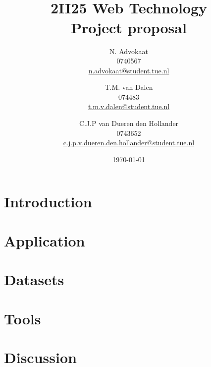 \documentclass[a4paper,11pt]{article}
\title{
	\HRule\\[0.6cm]
	{\Huge \bfseries 2II25 Web Technology}\\
	{\huge Project proposal}
	\HRule\\[0.4cm]
}
\author{
	N. Advokaat\\
	0740567\\
	\href{mailto:n.advokaat@student.tue.nl}{n.advokaat@student.tue.nl}
	\and
	T.M. van Dalen\\
	074483\\
	\href{mailto:t.m.v.dalen@student.tue.nl}{t.m.v.dalen@student.tue.nl}
	\and
	C.J.P van Dueren den Hollander\\
	0743652\\
	\href{mailto:c.j.p.v.dueren.den.hollander@student.tue.nl}{c.j.p.v.dueren.den.hollander@student.tue.nl}
}
\date{\today}
\begin{document}
	\maketitle
	\thispagestyle{empty}

	\newpage

	\section{Introduction}
	

	\section{Application}
	

	\section{Datasets}
	

	\section{Tools}
	

	\section{Discussion}
	
\end{document}
